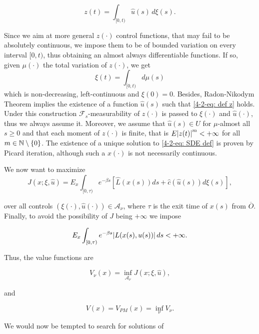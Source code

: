 \begin{equation}\label{4-2-eq: def z}
    z(t) = \int_{[0,t)} \hat{u}(s) \,d\xi(s).
\end{equation}

Since we aim at more general $z(\cdot)$ control functions, that may fail to be absolutely continuous, we impose them to be of bounded variation on every interval $[0,t)$, thus obtaining an almost always differentiable functions. If so, given $\mu(\cdot)$ the total variation of $z(\cdot)$, we get 
\[\xi(t)=\int_{[0,t)} d\mu(s)\]
which is non-decreasing, left-continuous and $\xi(0)=0$. Besides, Radon-Nikodym Theorem implies the existence of a function $\hat{u}(s)$ such that \eqref{4-2-eq: def z} holds. Under this construction $\mathcal{F}_s$-measurability of $z(\cdot)$ is passed to $\xi(\cdot)$ and $\hat{u}(\cdot)$, thus we always assume it. Moreover, we assume that $\hat{u}(s)\in U$ for $\mu$-almost all $s\geq 0$ and that each moment of $z(\cdot)$ is finite, that is $E\abs{z(t)}^m<+\infty$ for all $m\in\mathbb{N}\setminus\{0\}$.
The existence of a unique solution to \eqref{4-2-eq: SDE def} is proven by Picard iteration, although such a $x(\cdot)$ is not necessarily continuous. 

We now want to maximize
\begin{equation}\label{4-2-eq: def J}
    J(x;\xi,\hat{u}) = E_x\int_{[0,\tau)} e^{-\beta s}\left[\hat{L}(x(s))ds + \hat{c}(\hat{u}(s))d\xi(s)\right],
\end{equation}

over all controls $(\xi(\cdot),\hat{u}(\cdot))\in\mathcal{A}_{\nu}$, where $\tau$ is the exit time of $x(s)$ from $\overline{O}$. Finally, to avoid the possibility of $J$ being $+\infty$ we impose 

\begin{equation}
    E_x \int_{[0,\tau)} e^{-\beta s}\abs{L(x(s),u(s))}\,ds<+\infty.
\end{equation}

Thus, the value functions are

\begin{equation}
    V_{\nu}(x) = \inf_{\mathcal{A}_{\nu}} J(x;\xi,\hat{u}),
\end{equation}

and

\begin{equation}
    V(x) = V_{PM}(x) = \inf_{\nu} V_{\nu}.
\end{equation}

We would now be tempted to search for solutions of

